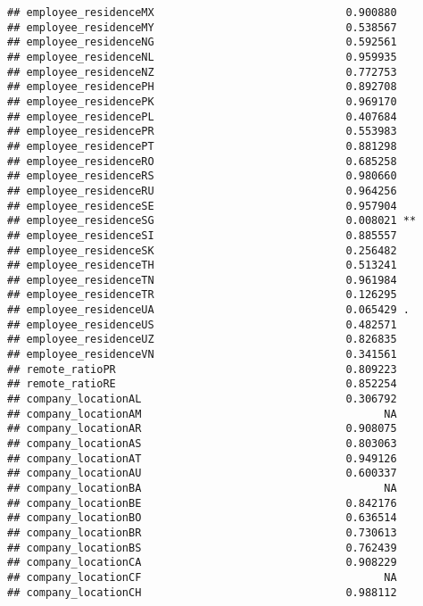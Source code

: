 \documentclass[
]{article}
\begin{document}
\begin{verbatim}
## employee_residenceMX                              0.900880    
## employee_residenceMY                              0.538567    
## employee_residenceNG                              0.592561    
## employee_residenceNL                              0.959935    
## employee_residenceNZ                              0.772753    
## employee_residencePH                              0.892708    
## employee_residencePK                              0.969170    
## employee_residencePL                              0.407684    
## employee_residencePR                              0.553983    
## employee_residencePT                              0.881298    
## employee_residenceRO                              0.685258    
## employee_residenceRS                              0.980660    
## employee_residenceRU                              0.964256    
## employee_residenceSE                              0.957904    
## employee_residenceSG                              0.008021 ** 
## employee_residenceSI                              0.885557    
## employee_residenceSK                              0.256482    
## employee_residenceTH                              0.513241    
## employee_residenceTN                              0.961984    
## employee_residenceTR                              0.126295    
## employee_residenceUA                              0.065429 .  
## employee_residenceUS                              0.482571    
## employee_residenceUZ                              0.826835    
## employee_residenceVN                              0.341561    
## remote_ratioPR                                    0.809223    
## remote_ratioRE                                    0.852254    
## company_locationAL                                0.306792    
## company_locationAM                                      NA    
## company_locationAR                                0.908075    
## company_locationAS                                0.803063    
## company_locationAT                                0.949126    
## company_locationAU                                0.600337    
## company_locationBA                                      NA    
## company_locationBE                                0.842176    
## company_locationBO                                0.636514    
## company_locationBR                                0.730613    
## company_locationBS                                0.762439    
## company_locationCA                                0.908229    
## company_locationCF                                      NA    
## company_locationCH                                0.988112    

\end{verbatim}
\end{document}
